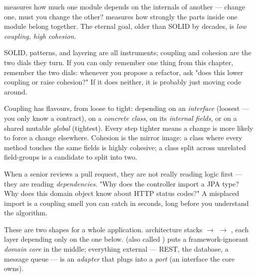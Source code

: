 
  measures how much one module depends on the internals of another --- change one, must you change the other?  measures how strongly the parts inside one module belong together. The eternal goal, older than SOLID by decades, is \emph{low coupling, high cohesion}.

 SOLID, patterns, and layering are all instruments; coupling and cohesion are the two dials they turn. If you can only remember one thing from this chapter, remember the two dials: whenever you propose a refactor, ask "does this lower coupling or raise cohesion?" If it does neither, it is probably just moving code around.

 Coupling has flavours, from loose to tight: depending on an \emph{interface} (loosest --- you only know a contract), on a \emph{concrete class}, on its \emph{internal fields}, or on a shared mutable \emph{global} (tightest). Every step tighter means a change is more likely to force a change elsewhere. Cohesion is the mirror image: a class where every method touches the same fields is highly cohesive; a class split across unrelated field-groups is a candidate to split into two.

\begin{seniornote}
When a senior reviews a pull request, they are not really reading logic first --- they are reading \emph{dependencies}. "Why does the controller import a JPA type? Why does this domain object know about HTTP status codes?" A misplaced import is a coupling smell you can catch in seconds, long before you understand the algorithm.
\end{seniornote}


 These are two shapes for a whole application.  architecture stacks  $\rightarrow$  $\rightarrow$ , each layer depending only on the one below.  (also called ) puts a framework-ignorant \emph{domain core} in the middle; everything external --- REST, the database, a message queue --- is an \emph{adapter} that plugs into a \emph{port} (an interface the core owns).

